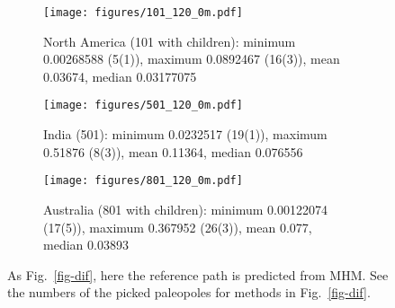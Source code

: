 \begin{figure*}
	\centering
	\begin{subfigure}{1.01\textwidth}
		\texttt{[image: figures/101\_120\_0m.pdf]}
		\caption{North America (101 with children): minimum 0.00268588 (5(1)),
		maximum 0.0892467 (16(3)), mean 0.03674, median 0.03177075}\label{fig-na-difm}
	\end{subfigure}
	\vspace{.1em}
	\begin{subfigure}{1.01\textwidth}
		\texttt{[image: figures/501\_120\_0m.pdf]}
		\caption{India (501): minimum 0.0232517 (19(1)), maximum 0.51876 (8(3)),
		mean 0.11364, median 0.076556}\label{fig-in-difm}
	\end{subfigure}
	\vspace{.1em}
	\begin{subfigure}{1.01\textwidth}
		\texttt{[image: figures/801\_120\_0m.pdf]}
		\caption{Australia (801 with children): minimum 0.00122074 (17(5)), maximum
		0.367952 (26(3)), mean 0.077, median 0.03893}\label{fig-au-difm}
	\end{subfigure}
	\caption[Differences of each plate's paleomagnetic APWPs versus
its MHM predicted APWP]{As Fig.~\ref{fig-dif}, here the reference path is
predicted from MHM\@. See the numbers of the picked paleopoles for methods in
Fig.~\ref{fig-dif}.}\label{fig-difm}
\end{figure*}

